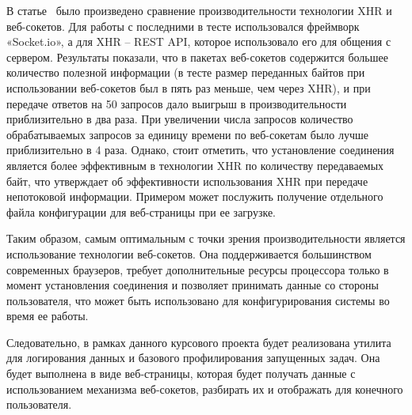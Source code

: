 В статье~\cite{websock_xhr_benchmark_site} было произведено сравнение
производительности технологии XHR и веб-сокетов. Для работы с последними в тесте
использовался фреймворк «Socket.io», а для XHR -- REST API, которое использовало его
для общения с сервером. Результаты показали, что в пакетах веб-сокетов содержится
большее количество полезной информации (в тесте размер переданных байтов
при использовании веб-сокетов был в пять раз меньше, чем через XHR), и при передаче
ответов на 50 запросов дало выигрыш в производительности приблизительно в два раза.
При увеличении числа запросов количество обрабатываемых запросов за единицу времени
по веб-сокетам было лучше приблизительно в 4 раза. Однако, стоит отметить,
что установление соединения является более эффективным в технологии XHR по количеству
передаваемых байт, что утверждает об эффективности использования XHR при передаче
непотоковой информации. Примером может послужить получение отдельного
файла конфигурации для веб-страницы при ее загрузке.

Таким образом, самым оптимальным с точки зрения производительности является
использование технологии веб-сокетов. Она поддерживается большинством современных
браузеров, требует дополнительные ресурсы процессора только в момент установления
соединения и позволяет принимать данные со стороны пользователя, что может быть
использовано для конфигурирования системы во время ее работы.

Следовательно, в рамках данного курсового проекта будет реализована утилита
для логирования данных и базового профилирования запущенных задач.
Она будет выполнена в виде веб-страницы, которая будет получать данные с
использованием механизма веб-сокетов, разбирать их и отображать для
конечного пользователя.
